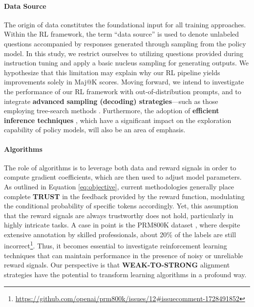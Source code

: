 \begin{itemize}[topsep=0pt]
\paragraph{Data Source} The origin of data constitutes the foundational input for all training approaches. Within the RL framework, the term “data source” is used to denote unlabeled questions accompanied by responses generated through sampling from the policy model. In this study, we restrict ourselves to utilizing questions provided during instruction tuning and apply a basic nucleus sampling for generating outputs. We hypothesize that this limitation may explain why our RL pipeline yields improvements solely in Maj@K scores. Moving forward, we intend to investigate the performance of our RL framework with out-of-distribution prompts, and to integrate \textbf{advanced sampling (decoding) strategies}—such as those employing tree-search methods \citep{yao2023tree}. Furthermore, the adoption of \textbf{efficient inference techniques} \citep{xia-etal-2023-speculative,leviathan2023fast,kwon2023efficient,xia2024unlocking}, which have a significant impact on the exploration capability of policy models, will also be an area of emphasis.

\paragraph{Algorithms} The role of algorithms is to leverage both data and reward signals in order to compute gradient coefficients, which are then used to adjust model parameters. As outlined in Equation \ref{eq:objective}, current methodologies generally place complete \textbf{TRUST} in the feedback provided by the reward function, modulating the conditional probability of specific tokens accordingly. Yet, this assumption that the reward signals are always trustworthy does not hold, particularly in highly intricate tasks. A case in point is the PRM800K dataset \citep{lightman2023let}, where despite extensive annotation by skilled professionals, about 20\% of the labels are still incorrect\footnote{\url{https://github.com/openai/prm800k/issues/12\#issuecomment-1728491852}}. Thus, it becomes essential to investigate reinforcement learning techniques that can maintain performance in the presence of noisy or unreliable reward signals. Our perspective is that \textbf{WEAK-TO-STRONG} alignment strategies \citep{burns2023weak} have the potential to transform learning algorithms in a profound way.


\end{itemize}
